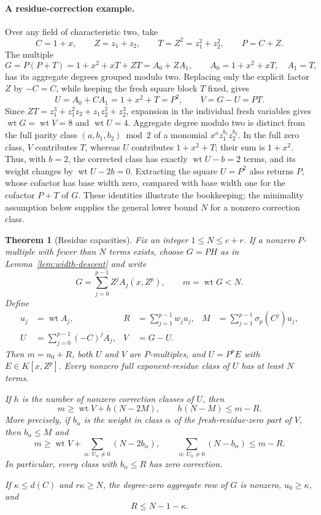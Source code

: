\documentclass[11pt]{article}
\DeclareMathOperator{\wt}{wt}\DeclareMathOperator{\ord}{ord}
\numberwithin{equation}{section}
\newtheorem{theorem}{Theorem}[section]
\theoremstyle{definition}\newtheorem{definition}[theorem]{Definition}
\theoremstyle{remark}\newtheorem{remark}[theorem]{Remark}
\begin{document}
\paragraph{A residue-correction example.}
Over any field of characteristic two, take
\[
 C=1+x,\qquad Z=z_1+z_2,\qquad T=Z^2=z_1^2+z_2^2,
 \qquad P=C+Z.
\]
The multiple
\[
 G=P(P+T)=1+x^2+xT+ZT=A_0+ZA_1,
 \qquad A_0=1+x^2+xT,\quad A_1=T,
\]
has its aggregate degrees grouped modulo two. Replacing only the explicit
factor $Z$ by $-C=C$, while keeping the fresh square block $T$ fixed, gives
\[
 U=A_0+CA_1=1+x^2+T=P^2,\qquad V=G-U=PT.
\]
Since $ZT=z_1^3+z_1^2z_2+z_1z_2^2+z_2^3$, expansion in the individual
fresh variables gives $\wt G=\wt V=8$ and $\wt U=4$.
Aggregate degree modulo two is distinct from the full parity class
$(a,b_1,b_2)\bmod2$ of a monomial $x^az_1^{b_1}z_2^{b_2}$.
In the full zero class, $V$ contributes $T$, whereas $U$ contributes
$1+x^2+T$; their sum is $1+x^2$. Thus, with $b=2$, the corrected
class has exactly $\wt U-b=2$ terms, and its weight changes by
$\wt U-2b=0$. Extracting the square $U=P^2$ also returns $P$, whose
cofactor has base width zero, compared with base width one for the
cofactor $P+T$ of $G$. These identities illustrate the bookkeeping;
the minimality assumption below supplies the general lower bound $N$
for a nonzero correction class.

\begin{theorem}[Residue capacities]\label{thm:residue-descent}
Fix an integer $1\le N\le c+r$. If a nonzero $P$-multiple with fewer than $N$
terms exists, choose $G=PH$ as in Lemma~\ref{lem:width-descent} and write
\[
 G=\sum_{j=0}^{p-1}Z^jA_j(x,Z^p),\qquad m=\wt G<N.
\]
Define
\begin{align*}
 u_j&=\wt A_j,&
 R&=\sum_{j=1}^{p-1}w_ju_j,&
 M&=\sum_{j=1}^{p-1}\sigma_p(C^j)u_j,\\
 U&=\sum_{j=0}^{p-1}(-C)^jA_j,&
 V&=G-U.
\end{align*}
Then $m=u_0+R$, both $U$ and $V$ are $P$-multiples, and
$U=P^pE$ with $E\in K[x,Z^p]$. Every nonzero full exponent-residue
class of $U$ has at least $N$ terms.

If $h$ is the number of nonzero correction classes of $U$, then
\begin{equation}\label{eq:residue-capacity}
 m\ge\wt V+h(N-2M),\qquad h(N-M)\le m-R.
\end{equation}
More precisely, if $b_\alpha$ is the weight in class $\alpha$ of
the fresh-residue-zero part of $V$, then $b_\alpha\le M$ and
\[
 m\ge\wt V+\sum_{\alpha:\,U_\alpha\ne0}(N-2b_\alpha),
 \qquad
 \sum_{\alpha:\,U_\alpha\ne0}(N-b_\alpha)\le m-R.
\]
In particular, every class with $b_\alpha\le R$ has zero correction.

If $\kappa\le d(C)$ and $r\kappa\ge N$, the degree-zero aggregate
row of $G$ is nonzero, $u_0\ge\kappa$, and
\begin{equation}\label{eq:residue-budget}
 R\le N-1-\kappa.
\end{equation}
\end{theorem}
\end{document}
